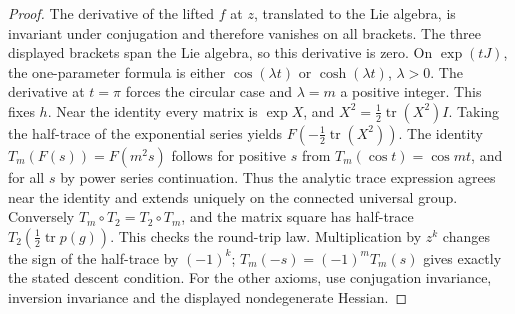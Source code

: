 \documentclass[11pt,reqno]{amsart}
\theoremstyle{definition}
\theoremstyle{remark}
\numberwithin{equation}{section}
\begin{document}
\begin{proof}
The derivative of the lifted \(f\) at \(z\), translated to the Lie algebra,
is invariant under conjugation and therefore vanishes on all brackets.
The three displayed brackets span the Lie algebra, so this derivative is
zero. On \(\exp(tJ)\), the one-parameter formula is either
\(\cos(\lambda t)\) or \(\cosh(\lambda t)\), \(\lambda>0\).
The derivative at \(t=\pi\) forces the circular case and
\(\lambda=m\) a positive integer. This fixes \(h\).
Near the identity every matrix is \(\exp X\), and
\(X^2=\tfrac12\operatorname{tr}(X^2)I\). Taking the half-trace of the
exponential series yields \(F(-\tfrac12\operatorname{tr}(X^2))\).
The identity \(T_m(F(s))=F(m^2s)\) follows for positive \(s\) from
\(T_m(\cos t)=\cos mt\), and for all \(s\) by power series continuation.
Thus the analytic trace expression agrees near the identity and extends
uniquely on the connected universal group. Conversely
\(T_m\circ T_2=T_2\circ T_m\), and the matrix square has half-trace
\(T_2(\tfrac12\operatorname{tr}p(g))\). This checks the round-trip law.
Multiplication by \(z^k\) changes the sign of the half-trace by
\((-1)^k\); \(T_m(-s)=(-1)^mT_m(s)\) gives exactly the stated descent
condition. For the other axioms, use conjugation invariance, inversion
invariance and the displayed nondegenerate Hessian.
\end{proof}
\end{document}
